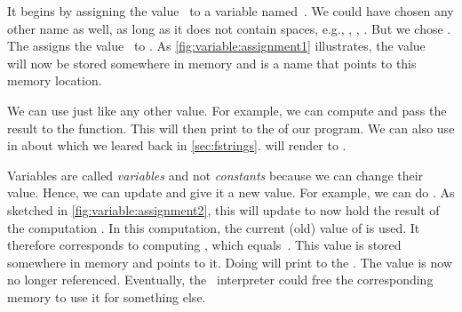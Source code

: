 It begins by assigning the  value~ to a variable named~.
We could have chosen any other name as well, as long as it does not contain spaces, e.g., , , .
But we chose .
The \pythonilIdx{=} assigns the value~ to .
As \cref{fig:variable:assignment1} illustrates, the value~ will now be stored somewhere in memory and  is a name that points to this memory location.%
%
\begin{sloppypar}%
We can use  just like any other value.
For example, we can compute  and pass the result to the  function.
This will then print  to the  of our program.
We can also use  in  about which we leared back in \cref{sec:fstrings}.
 will render to .%
\end{sloppypar}%
%
Variables are called \emph{variables} and not \emph{constants} because we can change their value.
Hence, we can update  and give it a new value.
For example, we can do .
As sketched in \cref{fig:variable:assignment2}, this will update  to now hold the result of the computation .
In this computation, the current (old) value of  is used.
It therefore corresponds to computing , which equals~.
This value is stored somewhere in memory and  points to it.
Doing  will print  to the .
The value  is now no longer referenced.
Eventually, the \python\ interpreter could free the corresponding memory to use it for something else.


